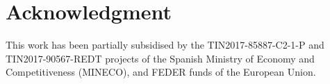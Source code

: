 \documentclass[journal]{IEEEtran}
\begin{document}
	


\section*{Acknowledgment}
This work has been partially subsidised by the TIN2017-85887-C2-1-P and TIN2017-90567-REDT projects of the Spanish Ministry of Economy and Competitiveness (MINECO), and FEDER funds of the European Union.

	
	\ifCLASSOPTIONcaptionsoff
	\newpage
	\fi
	
	
	
	
	

		

	
	
	
	
	
	
	
	
	
	
	
\end{document}
